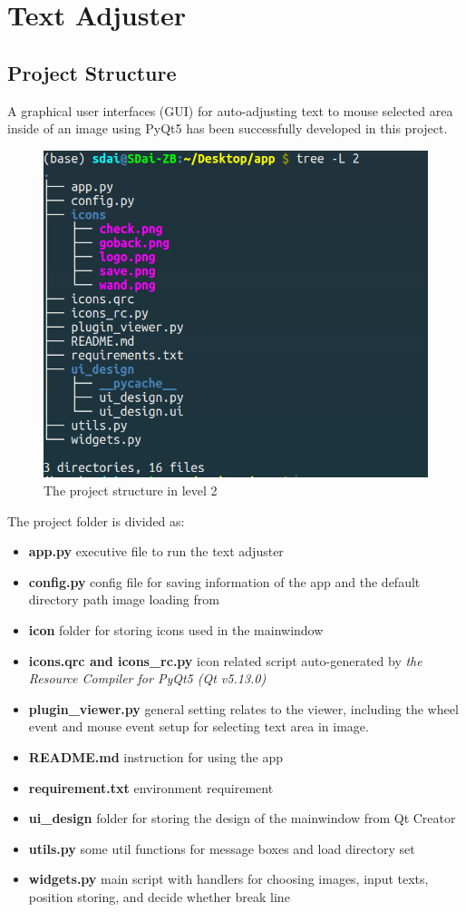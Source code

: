 \documentclass[a4paper, twoside]{report}
\begin{document}
{\chapter{Text Adjuster}
\section{Project Structure}

\noindent A graphical user interfaces (GUI) for auto-adjusting text to mouse selected area inside of an image using PyQt5 has been successfully developed in this project.    \\ \par

\begin{figure}[h!]
\centering
\includegraphics[width=.69\textwidth]{structure.png}
\caption{The project structure in level 2}
\end{figure}


\noindent The project folder is divided as:
\begin{itemize}
\item \textbf{app.py} executive file to run the text adjuster
\item \textbf{config.py} config file for saving information of the app and the default directory path image loading from
\item \textbf{icon} folder for storing icons used in the mainwindow
\item \textbf{icons.qrc and icons{\_}rc.py} icon related script auto-generated by \textit{the Resource Compiler for PyQt5 (Qt v5.13.0)}
\item \textbf{plugin{\_}viewer.py} general setting relates to the viewer, including the wheel event and mouse event setup for selecting text area in image.
\item \textbf{README.md} instruction for using the app
\item \textbf{requirement.txt} environment requirement
\item \textbf{ui{\_}design} folder for storing the design of the mainwindow from Qt Creator
\item \textbf{utils.py} some util functions for message boxes and load directory set
\item \textbf{widgets.py} main script with handlers for choosing images, input texts, position storing, and decide whether break line
\end{itemize}


}
\end{document}
